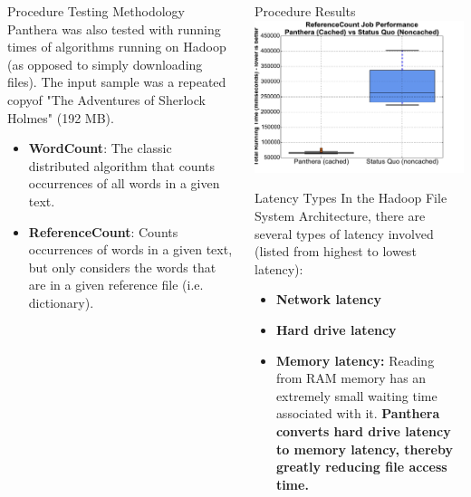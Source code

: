 \documentclass[final]{beamer} %
\begin{document}
\begin{frame}
\begin{columns}[t]
\begin{column}{0.32\textwidth}
	\begin{block}{Procedure Testing Methodology}
	Panthera was also tested with running times of algorithms running on Hadoop (as opposed to simply downloading files). The input sample was a repeated copyof "The 
	Adventures of Sherlock Holmes" (192 MB).
	\begin{itemize}
	\item \textbf{WordCount}: The classic distributed algorithm that counts occurrences
	of all words in a given text.
	\item \textbf{ReferenceCount}: Counts occurrences of words in a given text, but 
	only considers the words that are in a given reference file (i.e. dictionary).
	\end{itemize}
	\end{block}
	


	  
      \end{column}
      
      
      \begin{column}{0.32\textwidth}
		\begin{block}{Procedure Results}
		\vspace{1em}
		\includegraphics[scale=1]{assets/v2/refgetter_boxplot.pdf}
		\end{block}
	
	  \begin{block}{Latency Types}
		In the Hadoop File System Architecture, there are several types of latency involved (listed from highest to lowest latency):
		\begin{itemize}
		\item \textbf{Network latency}
		\item \textbf{Hard drive latency}
		\item \textbf{Memory latency: } Reading from RAM memory has an extremely small
		waiting time associated with it. \textbf{Panthera converts hard drive latency to memory latency, thereby greatly reducing file access time.}
		\end{itemize}
	  \end{block}
	

\end{column}
\end{columns}
\end{frame}
\end{document}
